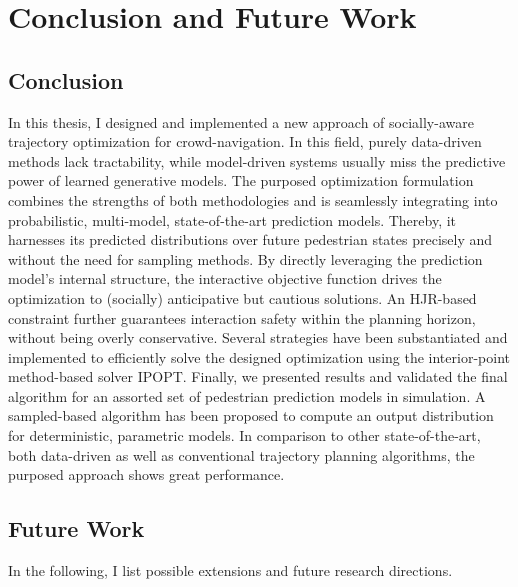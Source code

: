 \chapter{Conclusion and Future Work}
\label{text:conclusion}

\section{Conclusion}
\label{text:conclusions/conclusions}
In this thesis, I designed and implemented a new approach of socially-aware trajectory optimization for crowd-navigation. In this field, purely data-driven methods lack tractability, while model-driven systems usually miss the predictive power of learned generative models. The purposed optimization formulation combines the strengths of both methodologies and is seamlessly integrating into probabilistic, multi-model, state-of-the-art prediction models. Thereby, it harnesses its predicted distributions over future pedestrian states precisely and without the need for sampling methods.
\newline\newline
By directly leveraging the prediction model's internal structure, the interactive objective function drives the optimization to (socially) anticipative but cautious solutions. An \ac{HJR}-based constraint further guarantees interaction safety within the planning horizon, without being overly conservative.
\newline\newline
Several strategies have been substantiated and implemented to efficiently solve the designed optimization using the interior-point method-based solver \ac{IPOPT}.
\newline\newline
Finally, we presented results and validated the final algorithm for an assorted set of pedestrian prediction models in simulation. A sampled-based algorithm has been proposed to compute an output distribution for deterministic, parametric models. In comparison to other state-of-the-art, both data-driven as well as conventional trajectory planning algorithms, the purposed approach shows great performance.

\section{Future Work}
\label{text:conclusions/future_work}
In the following, I list possible extensions and future research directions.

